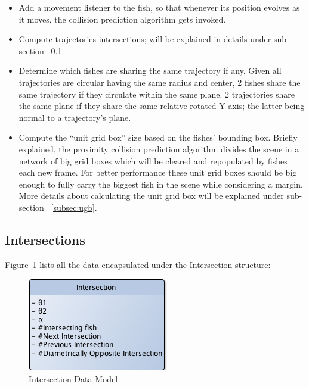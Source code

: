 \begin{itemize}

\item Add a movement listener to the fish, so that whenever its position evolves as it moves, the collision prediction algorithm gets invoked.

\item Compute trajectories intersections; will be explained in details under sub-section ~\ref{subsec:intersections}.

\item Determine which fishes are sharing the same trajectory if any. Given all trajectories are circular having the same radius and center, 2 fishes share the same trajectory if they circulate within the same plane. 2 trajectories share the same plane if they share the same relative rotated Y axis; the latter being normal to a trajectory's plane.

\item Compute the ``unit grid box'' size based on the fishes' bounding box. Briefly explained, the proximity collision prediction algorithm divides the scene in a network of big grid boxes which will be cleared and repopulated by fishes each new frame. For better performance these unit grid boxes should be big enough to fully carry the biggest fish in the scene while considering a margin. More details about calculating the unit grid box will be explained under sub-section ~\ref{subsec:ugb}.

\end{itemize}

\subsection{Intersections}
\label{subsec:intersections}

Figure~\ref{fig:intersection} lists all the data encapsulated under the Intersection structure:
\begin{figure}[H]
   \centering
   \includegraphics[scale=0.8]{figures/intersection.png}
   \caption{Intersection Data Model}
   \label{fig:intersection}
\end{figure}

